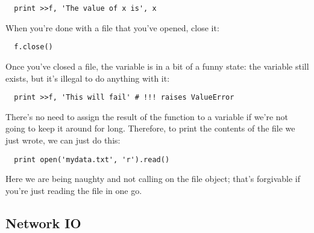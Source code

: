 \documentclass[letterpaper, 12pt, titlepage, twoside]{article}
\begin{document}
\begin{lstlisting}
  print >>f, 'The value of x is', x
\end{lstlisting}

When you're done with a file that you've opened, close it:

\begin{lstlisting}
  f.close()
\end{lstlisting}

Once you've closed a file, the  variable is in a bit of a funny state:
the variable still exists, but it's illegal to do anything with it:

\begin{lstlisting}
  print >>f, 'This will fail' # !!! raises ValueError
\end{lstlisting}

There's no need to assign the result of the  function to a variable
if we're not going to keep it around for long. Therefore, to print the
contents of the file we just wrote, we can just do this:

\begin{lstlisting}
  print open('mydata.txt', 'r').read()
\end{lstlisting}

Here we are being naughty and not calling  on the file object;
that's forgivable if you're just reading the file in one go.


\subsection*{Network IO}
\end{document}
